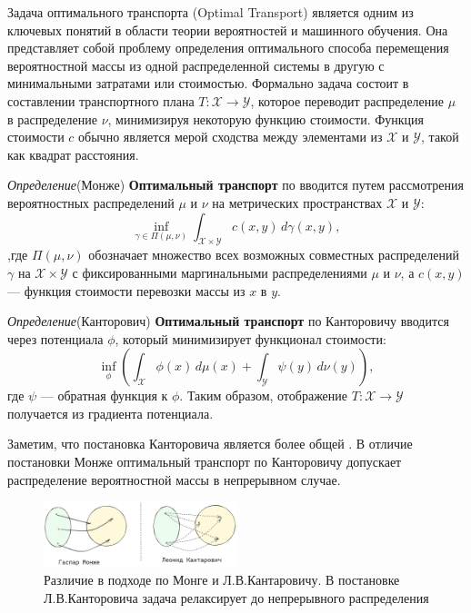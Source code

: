 Задача оптимального транспорта (Optimal Transport)\cite{villani2009optimal} является одним из ключевых понятий 
в области теории вероятностей и машинного обучения.
Она представляет собой проблему определения оптимального способа перемещения вероятностной массы из одной распределенной системы
в другую с минимальными затратами или стоимостью. Формально задача состоит в составлении транспортного плана \( T: \mathcal{X} \rightarrow \mathcal{Y} \), 
которое переводит распределение \( \mu \) в распределение \( \nu \), минимизируя некоторую функцию стоимости. 
Функция стоимости $c$ обычно является мерой сходства между элементами из \( \mathcal{X} \) и \( \mathcal{Y} \), такой как квадрат расстояния. 

\textit{Определение}(Монже) \textbf{Оптимальный транспорт} по  вводится путем рассмотрения  вероятностных распределений \( \mu \) и \( \nu \)
на метрических пространствах \( \mathcal{X} \) и \( \mathcal{Y} \):
\begin{equation}
    \inf_{\gamma \in \Pi(\mu, \nu)} \int_{\mathcal{X} \times \mathcal{Y}} c(x,y) \, d\gamma(x,y),
\end{equation}
,где \( \Pi(\mu, \nu) \) обозначает множество всех возможных совместных распределений 
\( \gamma \) на \( \mathcal{X} \times \mathcal{Y} \) с фиксированными маргинальными
распределениями \( \mu \) и \( \nu \), а \( c(x,y) \) — функция стоимости перевозки массы из \( x \) в \( y \).

\textit{Определение}(Канторович) \textbf{Оптимальный транспорт} по Канторовичу  вводится через потенциала  $\phi$, который минимизирует функционал стоимости:
\begin{equation}
    \inf_{\phi} \left( \int_{\mathcal{X}} \phi(x) \, d\mu(x) + \int_{\mathcal{Y}} \psi(y) \, d\nu(y) \right),
\end{equation}
где \( \psi \) — обратная функция к \( \phi \). Таким образом, отображение \( T: \mathcal{X} \rightarrow \mathcal{Y} \) получается из градиента потенциала.

Заметим, что постановка Канторовича является более общей \cite{monge_vs_kantarovich}. В отличие постановки Монже оптимальный транспорт
по Канторовичу допускает распределение вероятностной массы в непрерывном случае.

\begin{figure}[h]
    \centering
    \includegraphics[width=0.5\textwidth]{assets/math/transport/optimal_transport.excalidraw.png}
    \caption{Различие в подходе по Монге и Л.В.Кантаровичу. В постановке Л.В.Канторовича задача релаксирует до непрерывного распределения}
    \label{monge_vs_kantarovich}
\end{figure}

